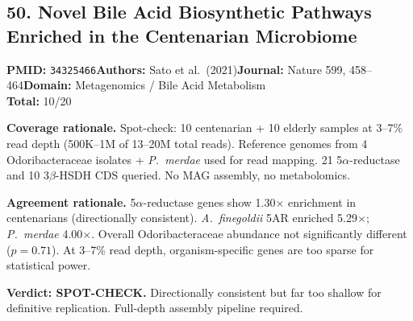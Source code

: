 \subsection{50. Novel Bile Acid Biosynthetic Pathways Enriched in the Centenarian Microbiome}
\textbf{PMID:} \texttt{34325466}\quad\textbf{Authors:} Sato et al.\ (2021)\quad\textbf{Journal:} Nature 599, 458--464\quad\textbf{Domain:} Metagenomics / Bile Acid Metabolism\\
\quad{}\quad\textbf{Total:} 10/20\par\smallskip
\noindent\textbf{Coverage rationale.} Spot-check: 10 centenarian + 10 elderly samples at 3--7\% read depth (500K--1M of 13--20M total reads). Reference genomes from 4 Odoribacteraceae isolates + \textit{P.\ merdae} used for read mapping. 21 5$\alpha$-reductase and 10 3$\beta$-HSDH CDS queried. No MAG assembly, no metabolomics.\par
\noindent\textbf{Agreement rationale.} 5$\alpha$-reductase genes show 1.30$\times$ enrichment in centenarians (directionally consistent). \textit{A.\ finegoldii} 5AR enriched 5.29$\times$; \textit{P.\ merdae} 4.00$\times$. Overall Odoribacteraceae abundance not significantly different ($p=0.71$). At 3--7\% read depth, organism-specific genes are too sparse for statistical power.\par\smallskip
\noindent\textbf{Verdict: SPOT-CHECK.} Directionally consistent but far too shallow for definitive replication. Full-depth assembly pipeline required.

